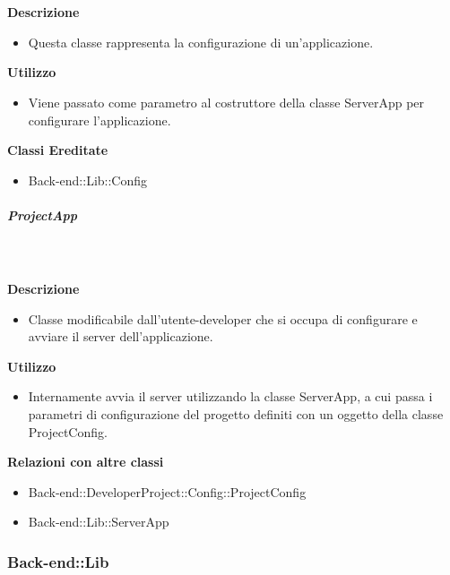 				\textbf{\\ \\ Descrizione} 
					\begin{itemize}
						\item[] Questa classe rappresenta la configurazione di un'applicazione.
					\end{itemize}      
				\textbf{Utilizzo}  
					\begin{itemize}
						\item[] Viene passato come parametro al costruttore della classe ServerApp per configurare l'applicazione.
					\end{itemize}
					\textbf{Classi Ereditate}
					\begin{itemize}
								\item{Back-end::Lib::Config}
					\end{itemize}
			\subparagraph{ProjectApp}
				
				\textbf{\\ \\ Descrizione} 
					\begin{itemize}
						\item[] Classe modificabile dall'utente-developer che si occupa di configurare e avviare il server dell'applicazione.
					\end{itemize}      
				\textbf{Utilizzo}  
					\begin{itemize}
						\item[] Internamente avvia il server utilizzando la classe ServerApp, a cui passa i parametri di configurazione del progetto definiti con un oggetto della classe ProjectConfig.
					\end{itemize}
					\textbf{Relazioni con altre classi}
					\begin{itemize}
							\item{Back-end::DeveloperProject::Config::ProjectConfig}
							\item{Back-end::Lib::ServerApp}
					\end{itemize}
	\subsubsection{Back-end::Lib}
